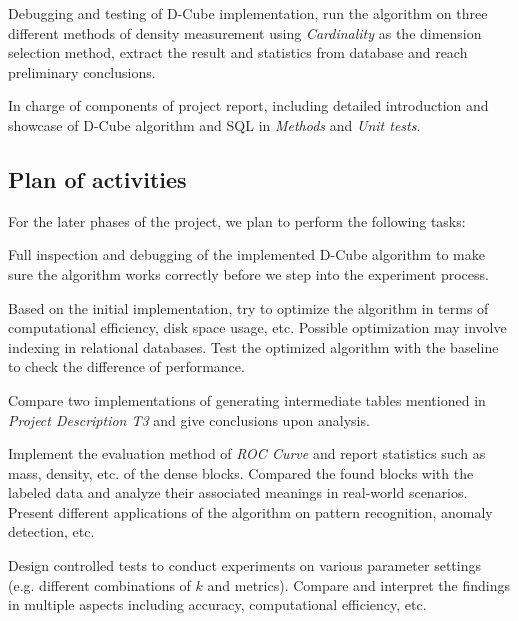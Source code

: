 \item Debugging and testing of D-Cube implementation, run the algorithm on three different methods of density measurement using \textit{Cardinality} as the dimension selection method, extract the result and statistics from database and reach preliminary conclusions. 

\item In charge of components of project report, including detailed introduction and showcase of D-Cube algorithm and SQL in \textit{Methods} and \textit{Unit tests}.

\eit


\subsection{Plan of activities}

For the later phases of the project, we plan to perform the following tasks:
\bit
\setlength\itemsep{1em}
\item Full inspection and debugging of the implemented D-Cube algorithm to make sure the algorithm works correctly before we step into the experiment process. 
\item Based on the initial implementation, try to optimize the algorithm in terms of computational efficiency, disk space usage, etc. Possible optimization may involve indexing in relational databases. Test the optimized algorithm with the baseline to check the difference of performance. 
\item Compare two implementations of generating intermediate tables mentioned in \textit{Project Description T3} and give conclusions upon analysis.
\item Implement the evaluation method of \textit{ROC Curve} and report statistics such as mass, density, etc. of the dense blocks. Compared the found blocks with the labeled data and analyze their associated meanings in real-world scenarios. Present different applications of the algorithm on pattern recognition, anomaly detection, etc.
\item Design controlled tests to conduct experiments on various parameter settings (e.g. different combinations of $k$ and metrics). Compare and interpret the findings in multiple aspects including accuracy, computational efficiency, etc.\\
\eit